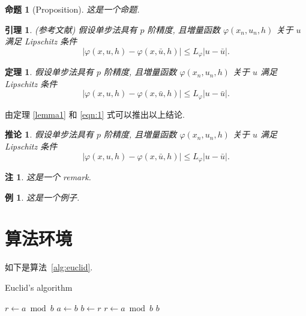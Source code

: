 \documentclass[UTF8,openany,twoside,12pt]{book}
\makeatletter
\theoremstyle{plain}
\newtheorem{proposition}{命题}[chapter]
\newtheorem{lemma}{引理}[chapter]
\newtheorem{theorem}{定理}[chapter]
\newtheorem{example}{例}[chapter]
\newtheorem{corollary}{推论}[chapter]
\newtheorem{remark}{注}[chapter]
\renewcommand{\proofname}{证明}
\renewenvironment{proof}[1][\proofname]{\par
  \pushQED{\qed}%
  \normalfont \topsep6\p@\@plus6\p@\relax
  \trivlist
  \item[\hskip\labelsep
        \bfseries
    #1\@addpunct{\,:\,}]\ignorespaces
}{%
  \popQED\endtrivlist\@endpefalse
}
\makeatother
\begin{document}
\begin{proposition}[Proposition]
这是一个命题.
\end{proposition}

\begin{lemma}\label{lemma-convergence} {\rm (\textit{参考文献}\cite{LiLiu1997})}
假设单步法具有 $p$ 阶精度, 且増量函数 $\varphi(x_{n}, u_{n}, h)$ 关于 $u$ 满足 {\rm Lipschitz} 条件
\begin{equation}\label{eqn:3}
|\varphi(x, u, h)-\varphi(x, \bar{u}, h)| \leqslant L_{\varphi}|u-\bar{u}|.
\end{equation}
\end{lemma}

\begin{theorem}\label{theorem-convergence}
假设单步法具有 $p$ 阶精度, 且増量函数 $\varphi(x_{n}, u_{n}, h)$ 关于 $u$ 满足 {\rm Lipschitz} 条件
\begin{equation}\label{eqn:4}
|\varphi(x, u, h)-\varphi(x, \bar{u}, h)| \leqslant L_{\varphi}|u-\bar{u}|.
\end{equation}
\end{theorem}
\begin{proof}[\normalfont\bfseries 证明~\nopunct]
由定理 \ref{lemma1} 和 \eqref{eqn:1} 式可以推出以上结论.
\end{proof}

\begin{corollary}\label{col-convergence}
假设单步法具有 $p$ 阶精度, 且増量函数 $\varphi(x_{n}, u_{n}, h)$ 关于 $u$ 满足 {\rm Lipschitz} 条件
\begin{equation}\label{eqn:5}
|\varphi(x, u, h)-\varphi(x, \bar{u}, h)| \leqslant L_{\varphi}|u-\bar{u}|.
\end{equation}
\end{corollary}


\begin{remark}\label{remark1}
这是一个 remark.
\end{remark}

\begin{example}
这是一个例子.
\end{example}


\clearpage
\section{算法环境}

如下是算法~\ref{alg:euclid}.
\begin{algorithm}[!htbp]
    \small
    \caption{Euclid's algorithm}\label{alg:euclid}
    \begin{algorithmic}[1]
        \State $r\gets a\bmod b$
        \State $a\gets b$
        \State $b\gets r$
        \State $r\gets a\bmod b$
        \EndWhile\label{euclidendwhile}
        \State \Return $b$
        \EndProcedure
    \end{algorithmic}
\end{algorithm}
\end{document}
